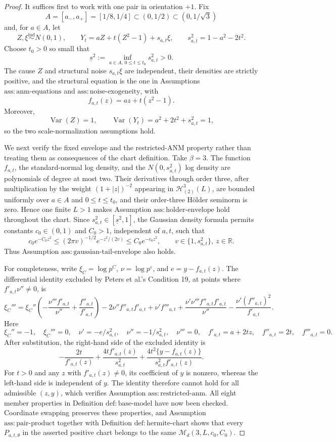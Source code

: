 \documentclass{article}
\begin{document}
\begin{proof}
It suffices first to work with one pair in orientation \(+1\).  Fix
\[
A=[a_-,a_+]=[1/8,1/4]\subset(0,1/2)\subset(0,1/\sqrt 3)
\]
and, for \(a\in A\), let
\[
Z,\xi\stackrel{\mathrm{ind}}{\sim}N(0,1),\qquad
Y_t=aZ+t(Z^2-1)+s_{a,t}\xi,\qquad
s_{a,t}^2=1-a^2-2t^2.
\]
Choose \(t_0>0\) so small that
\[
\underline s^2:=\inf_{a\in A,\,0\le t\le t_0}s_{a,t}^2>0.
\]
The cause \(Z\) and structural noise \(s_{a,t}\xi\) are independent, their densities are strictly positive, and the structural equation is the one in Assumptions \(\mathrm{ass:anm\text{-}equations}\) and \(\mathrm{ass:noise\text{-}exogeneity}\), with
\[
f_{a,t}(z)=az+t(z^2-1).
\]
Moreover,
\[
\operatorname{Var}(Z)=1,\qquad
\operatorname{Var}(Y_t)=a^2+2t^2+s_{a,t}^2=1,
\]
so the two scale-normalization assumptions hold.

We next verify the fixed envelope and the restricted-ANM property rather than treating them as consequences of the chart definition.  Take \(\beta=3\).  The function \(f_{a,t}\), the standard-normal log density, and the \(N(0,s_{a,t}^2)\) log density are polynomials of degree at most two.  Their derivatives through order three, after multiplication by the weight \((1+|z|)^{-2}\) appearing in \(\mathcal H_{(2)}^3(L)\), are bounded uniformly over \(a\in A\) and \(0\le t\le t_0\), and their order-three H\"older seminorm is zero.  Hence one finite \(L>1\) makes Assumption \(\mathrm{ass:holder\text{-}envelope}\) hold throughout the chart.  Since \(s_{a,t}^2\in[\underline s^2,1]\), the Gaussian density formula permits constants \(c_0\in(0,1)\) and \(C_0>1\), independent of \(a,t\), such that
\[
c_0e^{-C_0z^2}\le (2\pi v)^{-1/2}e^{-z^2/(2v)}\le C_0e^{-c_0z^2},\qquad
v\in\{1,s_{a,t}^2\},\ z\in\mathbb R.
\]
Thus Assumption \(\mathrm{ass:gaussian\text{-}tail\text{-}envelope}\) also holds.

For completeness, write \(\xi_C=\log p^C\), \(\nu=\log p^\varepsilon\), and \(e=y-f_{a,t}(z)\).  The differential identity excluded by Peters et al.'s Condition 19, at points where \(f'_{a,t}\nu''\ne0\), is
\[
\xi_C'''=\xi_C''\left(-\frac{\nu'''f'_{a,t}}{\nu''}+\frac{f''_{a,t}}{f'_{a,t}}\right)
-2\nu''f''_{a,t}f'_{a,t}+\nu'f'''_{a,t}
+\frac{\nu'\nu'''f''_{a,t}f'_{a,t}}{\nu''}
-\frac{\nu'(f''_{a,t})^2}{f'_{a,t}}.
\]
Here
\[
\xi_C''=-1,\quad \xi_C'''=0,\quad
\nu'=-e/s_{a,t}^2,\quad \nu''=-1/s_{a,t}^2,\quad \nu'''=0,\quad
f'_{a,t}=a+2tz,\quad f''_{a,t}=2t,\quad f'''_{a,t}=0.
\]
After substitution, the right-hand side of the excluded identity is
\[
-\frac{2t}{f'_{a,t}(z)}+\frac{4t f'_{a,t}(z)}{s_{a,t}^2}
+\frac{4t^2\{y-f_{a,t}(z)\}}{s_{a,t}^2f'_{a,t}(z)}.
\]
For \(t>0\) and any \(z\) with \(f'_{a,t}(z)\ne0\), its coefficient of \(y\) is nonzero, whereas the left-hand side is independent of \(y\).  The identity therefore cannot hold for all admissible \((z,y)\), which verifies Assumption \(\mathrm{ass:restricted\text{-}anm}\).  All eight member properties in Definition \(\mathrm{def:base\text{-}model}\) have now been checked.  Coordinate swapping preserves these properties, and Assumption \(\mathrm{ass:pair\text{-}product}\) together with Definition \(\mathrm{def:hermite\text{-}chart}\) shows that every \(P_{a,t,\theta}\) in the asserted positive chart belongs to the same \(\mathcal M_d(3,L,c_0,C_0)\).


\end{proof}
\end{document}

